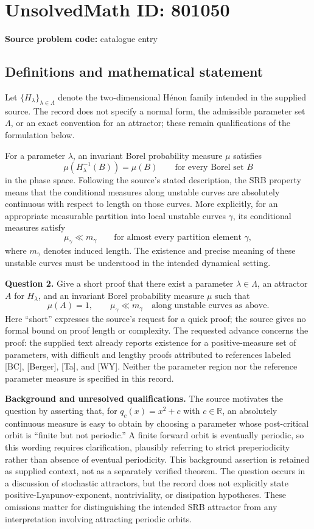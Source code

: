 \documentclass[11pt]{article}
\newcommand{\R}{\mathbb{R}}
\begin{document}
\section*{UnsolvedMath ID: 801050}
\textbf{Source problem code:} catalogue entry
\subsection{Definitions and mathematical statement}
Let \(\{H_\lambda\}_{\lambda\in\Lambda}\) denote the two-dimensional H\'enon family intended in the supplied source. The record does not specify a normal form, the admissible parameter set \(\Lambda\), or an exact convention for an attractor; these remain qualifications of the formulation below.

For a parameter \(\lambda\), an invariant Borel probability measure \(\mu\) satisfies
\[
\mu(H_\lambda^{-1}(B))=\mu(B)
\qquad\text{for every Borel set }B
\]
in the phase space. Following the source's stated description, the SRB property means that the conditional measures along unstable curves are absolutely continuous with respect to length on those curves. More explicitly, for an appropriate measurable partition into local unstable curves \(\gamma\), its conditional measures satisfy
\[
\mu_\gamma\ll m_\gamma
\qquad\text{for almost every partition element }\gamma,
\]
where \(m_\gamma\) denotes induced length. The existence and precise meaning of these unstable curves must be understood in the intended dynamical setting.

\textbf{Question 2.} Give a short proof that there exist a parameter \(\lambda\in\Lambda\), an attractor \(A\) for \(H_\lambda\), and an invariant Borel probability measure \(\mu\) such that
\[
\mu(A)=1,
\qquad
\mu_\gamma\ll m_\gamma
\quad\text{along unstable curves as above}.
\]
Here ``short'' expresses the source's request for a quick proof; the source gives no formal bound on proof length or complexity. The requested advance concerns the proof: the supplied text already reports existence for a positive-measure set of parameters, with difficult and lengthy proofs attributed to references labeled [BC], [Berger], [Ta], and [WY]. Neither the parameter region nor the reference parameter measure is specified in this record.

\textbf{Background and unresolved qualifications.} The source motivates the question by asserting that, for \(q_c(x)=x^2+c\) with \(c\in\R\), an absolutely continuous measure is easy to obtain by choosing a parameter whose post-critical orbit is ``finite but not periodic.'' A finite forward orbit is eventually periodic, so this wording requires clarification, plausibly referring to strict preperiodicity rather than absence of eventual periodicity. This background assertion is retained as supplied context, not as a separately verified theorem. The question occurs in a discussion of stochastic attractors, but the record does not explicitly state positive-Lyapunov-exponent, nontriviality, or dissipation hypotheses. These omissions matter for distinguishing the intended SRB attractor from any interpretation involving attracting periodic orbits.
\end{document}
